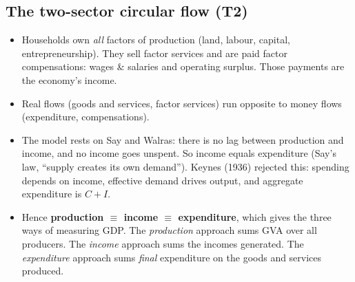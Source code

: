 \subsection*{The two-sector circular flow (T2)}

\begin{center}
\end{center}

\begin{itemize}
\item Households own \emph{all} factors of production (land, labour, capital, entrepreneurship). They
  sell factor services and are paid factor compensations: wages \& salaries and operating surplus.
  Those payments are the economy's income.
\item Real flows (goods and services, factor services) run opposite to money flows (expenditure,
  compensations).
\item The model rests on Say and Walras: there is no lag between production and income, and no
  income goes unspent. So income equals expenditure (Say's law, ``supply creates its own demand'').
  Keynes (1936) rejected this: spending depends on income, effective demand drives output, and
  aggregate expenditure is $C+I$.
\item Hence \textbf{production $\equiv$ income $\equiv$ expenditure}, which gives the three ways of
  measuring GDP. The \emph{production} approach sums GVA over all producers. The \emph{income}
  approach sums the incomes generated. The \emph{expenditure} approach sums \emph{final}
  expenditure on the goods and services produced.
\end{itemize}

